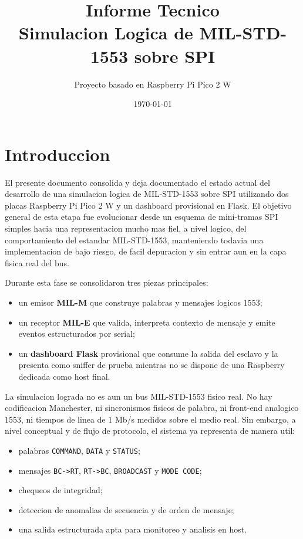 \documentclass[12pt,a4paper]{article}
\title{Informe Tecnico\\Simulacion Logica de MIL-STD-1553 sobre SPI}
\author{Proyecto basado en Raspberry Pi Pico 2 W}
\date{\today}
\begin{document}
\maketitle

\tableofcontents
\newpage

\section{Introduccion}

El presente documento consolida y deja documentado el estado actual del desarrollo de una
simulacion logica de MIL-STD-1553 sobre SPI utilizando dos placas Raspberry Pi Pico 2 W y un
dashboard provisional en Flask. El objetivo general de esta etapa fue evolucionar desde un esquema
de mini-tramas SPI simples hacia una representacion mucho mas fiel, a nivel logico, del
comportamiento del estandar MIL-STD-1553, manteniendo todavia una implementacion de bajo
riesgo, de facil depuracion y sin entrar aun en la capa fisica real del bus.

Durante esta fase se consolidaron tres piezas principales:

\begin{itemize}
    \item un emisor \textbf{MIL-M} que construye palabras y mensajes logicos 1553;
    \item un receptor \textbf{MIL-E} que valida, interpreta contexto de mensaje y emite eventos
    estructurados por serial;
    \item un \textbf{dashboard Flask} provisional que consume la salida del esclavo y la presenta
    como sniffer de prueba mientras no se dispone de una Raspberry dedicada como host final.
\end{itemize}

La simulacion lograda no es aun un bus MIL-STD-1553 fisico real. No hay codificacion Manchester,
ni sincronismos fisicos de palabra, ni front-end analogico 1553, ni tiempos de linea de 1 Mb/s
medidos sobre el medio real. Sin embargo, a nivel conceptual y de flujo de protocolo, el sistema
ya representa de manera util:

\begin{itemize}
    \item palabras \texttt{COMMAND}, \texttt{DATA} y \texttt{STATUS};
    \item mensajes \texttt{BC->RT}, \texttt{RT->BC}, \texttt{BROADCAST} y \texttt{MODE CODE};
    \item chequeos de integridad;
    \item deteccion de anomalias de secuencia y de orden de mensaje;
    \item una salida estructurada apta para monitoreo y analisis en host.
\end{itemize}
\end{document}

